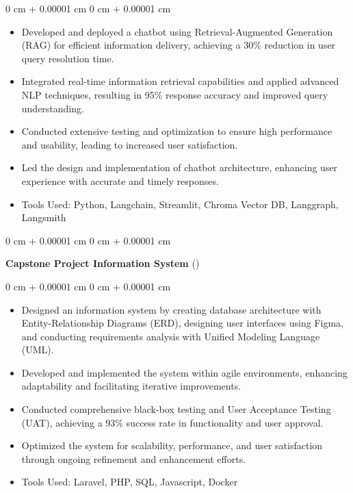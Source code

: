 \documentclass[10pt, a4paper]{article}
\newenvironment{highlights}{
    \begin{itemize}[
        topsep=0.10 cm,
        parsep=0.10 cm,
        partopsep=0pt,
        itemsep=0pt,
        leftmargin=0 cm + 10pt
    ]
}{
    \end{itemize}
} %
\newenvironment{onecolentry}{
    \begin{adjustwidth}{
        0 cm + 0.00001 cm
    }{
        0 cm + 0.00001 cm
    }
}{
    \end{adjustwidth}
} %
\newenvironment{twocolentry}[2][]{
    \onecolentry
    \def\secondColumn{#2}
    \setcolumnwidth{\fill, 4.5 cm}
    \begin{paracol}{2}
}{
    \switchcolumn \raggedleft \secondColumn
    \end{paracol}
    \endonecolentry
} %
\let\hrefWithoutArrow\href
\renewcommand{\href}[2]{\hrefWithoutArrow{#1}{\ifthenelse{\equal{#2}{}}{ }{#2 }\raisebox{.15ex}{\footnotesize \faExternalLink*}}}
\begin{document}
        \vspace{0.10 cm}
        \begin{onecolentry}
            \begin{highlights}
                \item Developed and deployed a chatbot using Retrieval-Augmented Generation (RAG) for efficient information delivery, achieving a 30\% reduction in user query resolution time.
                \item Integrated real-time information retrieval capabilities and applied advanced NLP techniques, resulting in 95\% response accuracy and improved query understanding.
                \item Conducted extensive testing and optimization to ensure high performance and usability, leading to increased user satisfaction.
                \item Led the design and implementation of chatbot architecture, enhancing user experience with accurate and timely responses.
                \item Tools Used: Python, Langchain, Streamlit, Chroma Vector DB, Langgraph, Langsmith
            \end{highlights}
        \end{onecolentry}


        \vspace{0.2 cm}

        \begin{twocolentry}{
            (\href{https://drive.google.com/file/d/1x37qvoekHEoIhrANusdd5onVDC--48Cn/view?usp=sharing}{Project Report})
        }
            \textbf{Capstone Project Information System}\end{twocolentry}

        \vspace{0.10 cm}
        \begin{onecolentry}
            \begin{highlights}
                \item Designed an information system by creating database architecture with Entity-Relationship Diagrams (ERD), designing user interfaces using Figma, and conducting requirements analysis with Unified Modeling Language (UML).
                \item Developed and implemented the system within agile environments, enhancing adaptability and facilitating iterative improvements.
                \item Conducted comprehensive black-box testing and User Acceptance Testing (UAT), achieving a 93\% success rate in functionality and user approval.
                \item Optimized the system for scalability, performance, and user satisfaction through ongoing refinement and enhancement efforts.
                \item Tools Used: Laravel, PHP, SQL, Javascript, Docker
            \end{highlights}
        \end{onecolentry}
\end{document}
